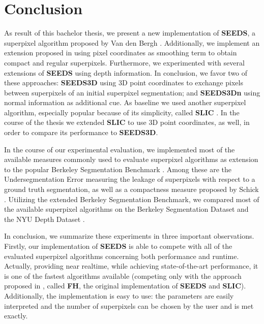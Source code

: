 \chapter{Conclusion}
\label{chapter:conclusion}

As result of this bachelor thesis, we present a new implementation of \textbf{SEEDS}, a superpixel algorithm proposed by Van den Bergh \etal \cite{VanDenBerghBoixRoigCapitaniVanGool:2012}. Additionally, we implement an extension proposed in \cite{VanDenBerghBoixRoigVanGool:2013} using pixel coordinates as smoothing term to obtain compact and regular superpixels. Furthermore, we experimented with several extensions of \textbf{SEEDS} using depth information. In conclusion, we favor two of these approaches: \textbf{SEEDS3D} using 3D point coordinates to exchange pixels between superpixels of an initial superpixel segmentation; and \textbf{SEEDS3Dn} using normal information as additional cue. As baseline we used another superpixel algorithm, especially popular because of its simplicity, called \textbf{SLIC} \cite{AchantaShajiSmithLucchiFuaSuesstrunk:2010}. In the course of the thesis we extended \textbf{SLIC} to use 3D point coordinates, as well, in order to compare its performance to \textbf{SEEDS3D}.

In the course of our experimental evaluation, we implemented most of the available measures commonly used to evaluate superpixel algorithms as extension to the popular Berkeley Segmentation Benchmark \cite{ArbelaezMaireFowlkesMalik:2011}. Among these are the Undersegmentation Error measuring the leakage of superpixels with respect to a ground truth segmentation, as well as a compactness measure proposed by Schick \etal \cite{SchickFischerStiefelhagen:2012}. Utilizing the extended Berkeley Segmentation Benchmark, we compared most of the available superpixel algorithms on the Berkeley Segmentation Dataset \cite{ArbelaezMaireFowlkesMalik:2011} and the NYU Depth Dataset \cite{SilbermanHoiemKohliFergus:2012}.

In conclusion, we summarize these experiments in three important observations. Firstly, our implementation of \textbf{SEEDS} is able to compete with all of the evaluated superpixel algorithms concerning both performance and runtime. Actually, providing near realtime, while achieving state-of-the-art performance, it is one of the fastest algorithms available (competing only with the approach proposed in \cite{FelzenswalbHuttenlocher:2004}, called \textbf{FH}, the original implementation of \textbf{SEEDS} and \textbf{SLIC}). Additionally, the implementation is easy to use: the parameters are easily interpreted and the number of superpixels can be chosen by the user and is met exactly.


